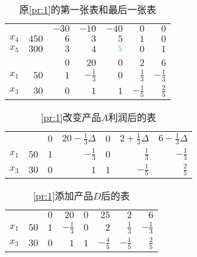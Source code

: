 \documentclass[chinese]{assignment}[2019/10/15]
\newcommand{\basis}[1]{\textcolor{Aquamarine}{#1}}
\begin{document}
    \begin{table}[htb]
        \begin{center}
            \caption{原\ref{pr:1}的第一张表和最后一张表}
            \begin{tabularx}{14cm}{cR|*{5}{R}}
                \toprule
                &  & $-30$ & $-10$ & $-40$ & $0$ & $0$\\
                $x_4$ & $450$ & $6$ & $3$ & $5$ & $1$ & $0$\\
                $x_5$ & $300$ & $3$ & $4$ & $\basis{5}$ & $0$ & $1$\\
                \midrule \\ \midrule
                &  & $0$ & $20$ & $0$ & $2$ & $6$\\
                $x_1$ & $50$ & $1$ & $-\tfrac{1}{3}$ & $0$ & $\tfrac{1}{3}$ & $-\tfrac{1}{3}$\\
                $x_3$ & $30$ & $0$ & $1$ & $1$ & $-\tfrac{1}{5}$ & $\tfrac{2}{5}$\\
                \bottomrule
            \end{tabularx}
        \end{center}
    \end{table}
    \begin{table}[htb]
        \begin{center}
            \caption{\ref{pr:1}改变产品$A$利润后的表}
            \begin{tabularx}{14cm}{cR|*{5}{R}}
                \toprule
                &  & $0$ & $20-\tfrac{1}{3}\Delta$ & $0$ & $2+\tfrac{1}{3}\Delta$ & $6-\tfrac{1}{3}\Delta$\\
                $x_1$ & $50$ & $1$ & $-\tfrac{1}{3}$ & $0$ & $\tfrac{1}{3}$ & $-\tfrac{1}{3}$\\
                $x_3$ & $30$ & $0$ & $1$ & $1$ & $-\tfrac{1}{5}$ & $\tfrac{2}{5}$\\
                \bottomrule
            \end{tabularx}
        \end{center}
    \end{table}
    \begin{table}[htb]
        \begin{center}
            \caption{\ref{pr:1}添加产品$D$后的表}
            \begin{tabularx}{14cm}{cR|*{6}{R}}
                \toprule
                &  & $0$ & $20$ & $0$ & $25$& $2$ & $6$\\
                $x_1$ & $50$ & $1$ & $-\tfrac{1}{3}$ & $0$ & $2$ & $\tfrac{1}{3}$ & $-\tfrac{1}{3}$\\
                $x_3$ & $30$ & $0$ & $1$ & $1$ & $-\tfrac{4}{5}$ & $-\tfrac{1}{5}$ & $\tfrac{2}{5}$\\
                \bottomrule
            \end{tabularx}
        \end{center}
    \end{table}
\end{document}
